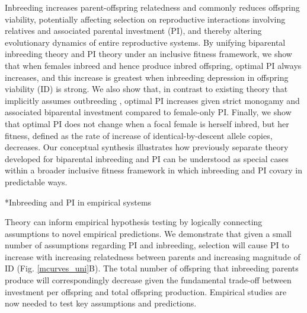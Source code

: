 \documentclass[12pt]{article}
\makeatletter
\renewcommand\subsection{\@startsection{subsection}{1}{-0.25in}{-0.5\baselineskip}{0.1\baselineskip}{\normalfont\normalsize\bfseries\textit}}
\makeatother
\begin{document}
Inbreeding increases parent-offspring relatedness and commonly reduces offspring viability, potentially affecting selection on reproductive interactions involving relatives and associated parental investment (PI), and thereby altering evolutionary dynamics of entire reproductive systems.  By unifying biparental inbreeding theory and PI theory under an inclusive fitness framework, we show that when females inbreed and hence produce inbred offspring, optimal PI always increases, and this increase is greatest when inbreeding depression in offspring viability (ID) is strong. We also show that, in contrast to existing theory that implicitly assumes outbreeding \cite[][]{Parker1985}, optimal PI increases given strict monogamy and associated biparental investment compared to female-only PI. Finally, we show that optimal PI does not change when a focal female is herself inbred, but her fitness, defined as the rate of increase of identical-by-descent allele copies, decreases. Our conceptual synthesis illustrates how previously separate theory developed for biparental inbreeding \cite[][]{Parker1979, Parker2006} and PI \cite[][]{Macnair1978, Parker1978} can be understood as special cases within a broader inclusive fitness framework in which inbreeding and PI covary in predictable ways.

\subsection*{Inbreeding and PI in empirical systems}

Theory can inform empirical hypothesis testing by logically connecting assumptions to novel empirical predictions. We demonstrate that given a small number of assumptions regarding PI and inbreeding, selection will cause PI to increase with increasing relatedness between parents and increasing magnitude of ID (Fig. \ref{mcurves_uni}B). The total number of offspring that inbreeding parents produce will correspondingly decrease given the fundamental trade-off between investment per offspring and total offspring production. Empirical studies are now needed to test key assumptions and predictions. %
\end{document}
